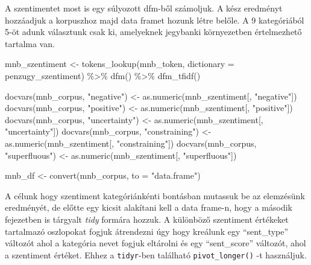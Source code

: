 \documentclass[
]{book}
\newenvironment{Shaded}{\begin{snugshade}}{\end{snugshade}}
\newcommand{\AttributeTok}[1]{\textcolor[rgb]{0.77,0.63,0.00}{#1}}
\newcommand{\FunctionTok}[1]{\textcolor[rgb]{0.00,0.00,0.00}{#1}}
\newcommand{\NormalTok}[1]{#1}
\newcommand{\OtherTok}[1]{\textcolor[rgb]{0.56,0.35,0.01}{#1}}
\newcommand{\SpecialCharTok}[1]{\textcolor[rgb]{0.00,0.00,0.00}{#1}}
\newcommand{\StringTok}[1]{\textcolor[rgb]{0.31,0.60,0.02}{#1}}
\begin{document}
A szentimentet most is egy súlyozott dfm-ből számoljuk. A kész eredményt
hozzáadjuk a korpuszhoz majd data framet hozunk létre belőle. A 9
kategóriából 5-öt adunk választunk csak ki, amelyeknek jegybanki
környezetben értelmezhető tartalma van.

\begin{Shaded}
\begin{Highlighting}[]
\NormalTok{mnb\_szentiment }\OtherTok{\textless{}{-}} \FunctionTok{tokens\_lookup}\NormalTok{(mnb\_token, }\AttributeTok{dictionary =}\NormalTok{ penzugy\_szentiment) }\SpecialCharTok{\%\textgreater{}\%}
  \FunctionTok{dfm}\NormalTok{() }\SpecialCharTok{\%\textgreater{}\%}
  \FunctionTok{dfm\_tfidf}\NormalTok{()}

\FunctionTok{docvars}\NormalTok{(mnb\_corpus, }\StringTok{"negative"}\NormalTok{) }\OtherTok{\textless{}{-}} \FunctionTok{as.numeric}\NormalTok{(mnb\_szentiment[, }\StringTok{"negative"}\NormalTok{])}
\FunctionTok{docvars}\NormalTok{(mnb\_corpus, }\StringTok{"positive"}\NormalTok{) }\OtherTok{\textless{}{-}} \FunctionTok{as.numeric}\NormalTok{(mnb\_szentiment[, }\StringTok{"positive"}\NormalTok{])}
\FunctionTok{docvars}\NormalTok{(mnb\_corpus, }\StringTok{"uncertainty"}\NormalTok{) }\OtherTok{\textless{}{-}} \FunctionTok{as.numeric}\NormalTok{(mnb\_szentiment[, }\StringTok{"uncertainty"}\NormalTok{])}
\FunctionTok{docvars}\NormalTok{(mnb\_corpus, }\StringTok{"constraining"}\NormalTok{) }\OtherTok{\textless{}{-}} \FunctionTok{as.numeric}\NormalTok{(mnb\_szentiment[, }\StringTok{"constraining"}\NormalTok{])}
\FunctionTok{docvars}\NormalTok{(mnb\_corpus, }\StringTok{"superfluous"}\NormalTok{) }\OtherTok{\textless{}{-}} \FunctionTok{as.numeric}\NormalTok{(mnb\_szentiment[, }\StringTok{"superfluous"}\NormalTok{])}

\NormalTok{mnb\_df }\OtherTok{\textless{}{-}} \FunctionTok{convert}\NormalTok{(mnb\_corpus, }\AttributeTok{to =} \StringTok{"data.frame"}\NormalTok{)}
\end{Highlighting}
\end{Shaded}

A célunk hogy szentiment kategóriánkénti bontásban mutassuk be az
elemzésünk eredményét, de előtte egy kicsit alakítani kell a data
frame-n, hogy a második fejezetben is tárgyalt \emph{tidy} formára
hozzuk. A különböző szentiment értékeket tartalmazó oszlopokat fogjuk
átrendezni úgy hogy kreálunk egy ``sent\_type'' változót ahol a
kategória nevet fogjuk eltárolni és egy ``sent\_score'' változót, ahol a
szentiment értéket. Ehhez a \texttt{tidyr}-ben található
\texttt{pivot\_longer()} -t használjuk.
\end{document}
